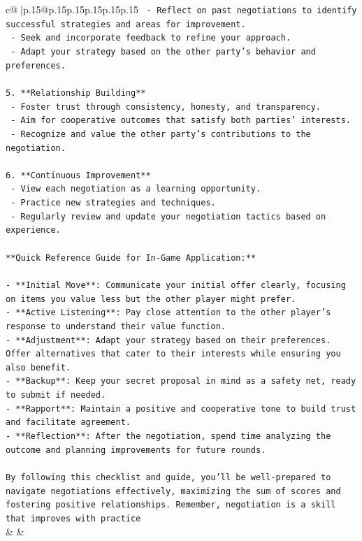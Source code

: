 \documentclass{article}
\begin{document}
{\begin{supertabular}{c@{$\;$}|p{.15\linewidth}@{}p{.15\linewidth}p{.15\linewidth}p{.15\linewidth}p{.15\linewidth}p{.15\linewidth}}
{{{\texttt{   {-} Reflect on past negotiations to identify successful strategies and areas for improvement.} \\
\texttt{   {-} Seek and incorporate feedback to refine your approach.} \\
\texttt{   {-} Adapt your strategy based on the other party's behavior and preferences.} \\
\\ 
\texttt{5. **Relationship Building**} \\
\texttt{   {-} Foster trust through consistency, honesty, and transparency.} \\
\texttt{   {-} Aim for cooperative outcomes that satisfy both parties' interests.} \\
\texttt{   {-} Recognize and value the other party's contributions to the negotiation.} \\
\\ 
\texttt{6. **Continuous Improvement**} \\
\texttt{   {-} View each negotiation as a learning opportunity.} \\
\texttt{   {-} Practice new strategies and techniques.} \\
\texttt{   {-} Regularly review and update your negotiation tactics based on experience.} \\
\\ 
\texttt{**Quick Reference Guide for In{-}Game Application:**} \\
\\ 
\texttt{{-} **Initial Move**: Communicate your initial offer clearly, focusing on items you value less but the other player might prefer.} \\
\texttt{{-} **Active Listening**: Pay close attention to the other player's response to understand their value function.} \\
\texttt{{-} **Adjustment**: Adapt your strategy based on their preferences. Offer alternatives that cater to their interests while ensuring you also benefit.} \\
\texttt{{-} **Backup**: Keep your secret proposal in mind as a safety net, ready to submit if needed.} \\
\texttt{{-} **Rapport**: Maintain a positive and cooperative tone to build trust and facilitate agreement.} \\
\texttt{{-} **Reflection**: After the negotiation, spend time analyzing the outcome and planning improvements for future rounds.} \\
\\ 
\texttt{By following this checklist and guide, you'll be well{-}prepared to navigate negotiations effectively, maximizing the sum of scores and fostering positive relationships. Remember, negotiation is a skill that improves with practice} \\
            }
        }
    }
    & & \\ \\


\end{supertabular}}
\end{document}
